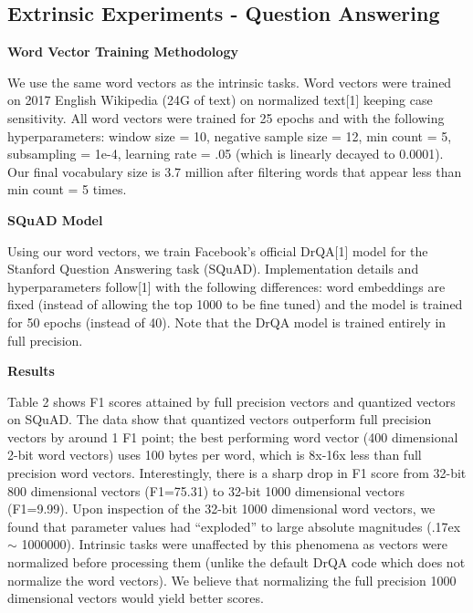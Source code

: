 \documentclass{article} %
\begin{document}
\subsection{Extrinsic Experiments - Question Answering}

\textbf{Word Vector Training Methodology}

We use the same word vectors as the intrinsic tasks. Word vectors were
trained on 2017 English Wikipedia (24G of text) on normalized text[1]
keeping case sensitivity. All word vectors were trained for 25 epochs
and with the following hyperparameters: window size = 10, negative
sample size = 12, min count = 5, subsampling = 1e-4, learning rate =
.05 (which is linearly decayed to 0.0001). Our final vocabulary size
is 3.7 million after filtering words that appear less than min count =
5 times.

\textbf{SQuAD Model}

Using our word vectors, we train Facebook's official DrQA[1] model for the Stanford Question Answering
task (SQuAD). Implementation details and
hyperparameters follow[1] with the following differences: word
embeddings are fixed (instead of allowing the top 1000 to be fine
tuned) and the model is trained for 50 epochs (instead of 40). Note
that the DrQA model is trained entirely in full precision.

\textbf{Results}

Table 2 shows F1 scores attained by full precision vectors and
quantized vectors on SQuAD. The data show that quantized vectors
outperform full precision vectors by around 1 F1 point; the best
performing word vector (400 dimensional 2-bit word vectors) uses 100
bytes per word, which is 8x-16x less than full precision word
vectors. Interestingly, there is a sharp drop in F1 score from
32-bit 800 dimensional vectors (F1=75.31) to 32-bit 1000 dimensional
vectors (F1=9.99). Upon inspection of the 32-bit 1000 dimensional word
vectors, we found that parameter values had ``exploded'' to large
absolute magnitudes ({\raise.17ex\hbox{$\scriptstyle\mathtt{\sim}$}}
1000000). Intrinsic tasks were unaffected by this phenomena as vectors
were normalized before processing them (unlike the default DrQA code
which does not normalize the word vectors). We believe that
normalizing the full precision 1000 dimensional vectors would yield
better scores.
\end{document}
